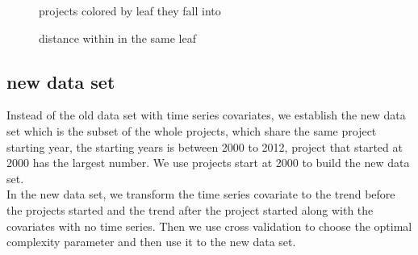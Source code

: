 \begin{figure}
	\centering
	\label{fig:leaf}
	\caption{projects colored by leaf they fall into }
\end{figure}


\begin{figure}
	\centering
	\label{fig:leafiest}
	\caption{distance within in the same leaf}
\end{figure}


\subsection{new data set}
Instead of the old data set with time series covariates, we establish the new data set which is the subset of the whole projects, which share the same project starting year, the starting years is between 2000 to 2012, project that started at 2000 has the largest number. We use projects start at 2000 to build the new data set.\\
In the new data set, we transform the time series covariate to the trend before the projects started and the trend after the project started along with the covariates with no time series. Then we use cross validation to choose the optimal complexity parameter and then use it to the new data set. 



